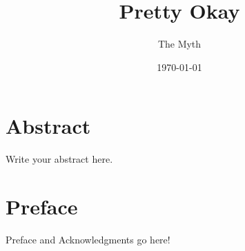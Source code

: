 \documentclass{dcthesis}
\title{Pretty Okay}
\author{The Myth}
\date{\today}
\theoremstyle{definition}
\theoremstyle{remark}
\begin{document}
\frontmatter

\maketitle

\chapter*{Abstract}
Write your abstract here.

\chapter*{Preface}
Preface and Acknowledgments go here!

\tableofcontents



\mainmatter




\backmatter

%
%

\end{document}
